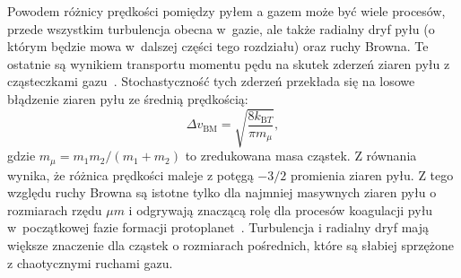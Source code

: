 %
Powodem różnicy prędkości pomiędzy pyłem a gazem może być wiele procesów,
przede wszystkim turbulencja obecna w~gazie, ale także radialny dryf pyłu (o
którym będzie mowa w~dalszej części tego rozdziału) oraz ruchy Browna.  Te
ostatnie są wynikiem transportu momentu pędu na skutek zderzeń ziaren pyłu z
cząsteczkami gazu~\cite{E1905}.  Stochastyczność tych zderzeń przekłada się na
losowe błądzenie ziaren pyłu ze średnią prędkością:
%
\begin{equation}
   \Delta v_{\textrm{BM}} = \sqrt{\frac{8k_{\textrm{B} T}}{\pi m_\mu}},
\label{eq:bm}
\end{equation}
%
gdzie $m_\mu = m_1m_2/(m_1+m_2)$ to zredukowana masa cząstek. Z
równania~ wynika, że różnica prędkości maleje z potęgą $-3/2$
promienia ziaren pyłu. Z tego względu ruchy Browna są istotne tylko dla najmniej
masywnych ziaren pyłu o rozmiarach rzędu $\mu m$ i odgrywają znaczącą rolę dla
procesów koagulacji pyłu w~początkowej fazie formacji protoplanet~\citep{DD05}. 
Turbulencja i radialny dryf mają większe znaczenie dla cząstek o
rozmiarach pośrednich, które są słabiej sprzężone z chaotycznymi ruchami gazu.


